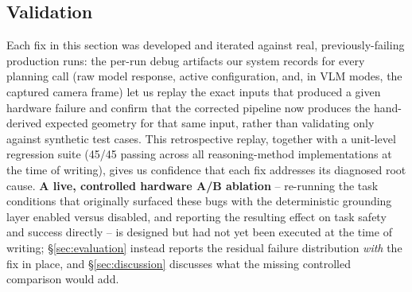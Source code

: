 \subsection{Validation}
\label{sec:validation}

Each fix in this section was developed and iterated against real,
previously-failing production runs: the per-run debug artifacts our
system records for every planning call (raw model response, active
configuration, and, in VLM modes, the captured camera frame) let us
replay the exact inputs that produced a given hardware failure and
confirm that the corrected pipeline now produces the hand-derived
expected geometry for that same input, rather than validating only
against synthetic test cases. This retrospective replay, together with a
unit-level regression suite (45/45 passing across all reasoning-method
implementations at the time of writing), gives us confidence that each
fix addresses its diagnosed root cause. \textbf{A live, controlled
hardware A/B ablation} -- re-running the task conditions that originally
surfaced these bugs with the deterministic grounding layer enabled versus
disabled, and reporting the resulting effect on task safety and success
directly -- is designed but had not yet been executed at the time of
writing; \S\ref{sec:evaluation} instead reports the residual failure
distribution \emph{with} the fix in place, and \S\ref{sec:discussion}
discusses what the missing controlled comparison would add.
